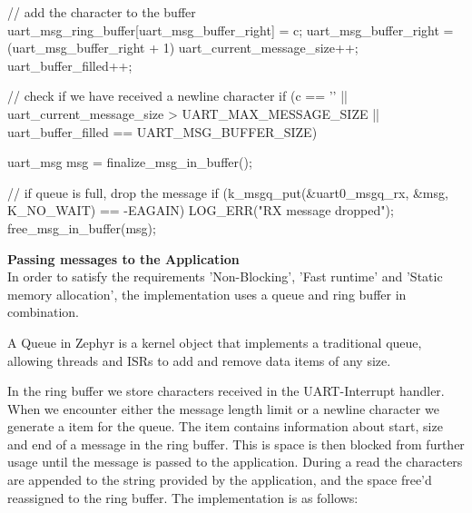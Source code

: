 \begin{cpp}
{{        // add the character to the buffer
        uart_msg_ring_buffer[uart_msg_buffer_right] = c;
        uart_msg_buffer_right = (uart_msg_buffer_right + 1) %
        uart_current_message_size++;
        uart_buffer_filled++;

        // check if we have received a newline character
        if (c == '\n' || uart_current_message_size > UART_MAX_MESSAGE_SIZE || uart_buffer_filled == UART_MSG_BUFFER_SIZE)
        {
            uart_msg msg = finalize_msg_in_buffer();

            // if queue is full, drop the message
            if (k_msgq_put(&uart0_msgq_rx, &msg, K_NO_WAIT) == -EAGAIN)
            {
                LOG_ERR("RX message dropped");
                free_msg_in_buffer(msg);
            }
        }
    }
}
\end{cpp}


\textbf{Passing messages to the Application} \\
In order to satisfy the requirements 'Non-Blocking', 'Fast runtime' and 'Static memory allocation', the implementation uses a queue and ring buffer in combination. 

A Queue in Zephyr is a kernel object that implements a traditional queue, allowing threads and ISRs to add and remove data items of any size. \cite{ZEPHYR_QUEUE}

In the ring buffer we store characters received in the UART-Interrupt handler.
When we encounter either the message length limit or a newline character we generate a item for the queue. The item contains information about start, size and end of a message in the ring buffer. This is space is then blocked from further usage until the message is passed to the application. During a read the characters are appended to the string provided by the application, and the space free'd reassigned to the ring buffer. The implementation is as follows:

